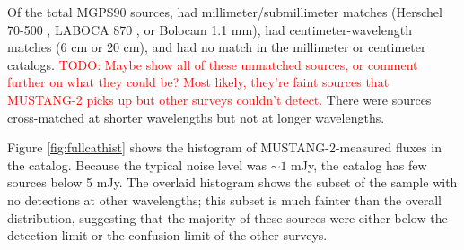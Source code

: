 \documentclass[twocolumn]{aastex62}
\def\todo#1{{\textcolor{red}{TODO: #1}}}
\newcommand{\MGPS}{MGPS90\xspace}
\newcommand{\MUSTANG}{MUSTANG-2\xspace}
\begin{document}

Of the \nsources total \MGPS sources, \mmdetections had millimeter/submillimeter
matches (Herschel 70-500 \um, LABOCA 870 \um, or Bolocam 1.1 mm), \cmdetections 
had centimeter-wavelength matches (6 cm or 20 cm), and \cmmmnondetections
had no match in the millimeter or centimeter catalogs.  \todo{Maybe show all of these unmatched sources, or comment further on what they could be?  Most likely, they're faint sources that \MUSTANG picks up but other surveys couldn't detect.}  There were
\mmdetectionscmnondetections sources cross-matched at shorter wavelengths
but not at longer wavelengths.  


Figure \ref{fig:fullcathist} shows the histogram of \MUSTANG-measured fluxes
in the catalog.  Because the typical noise level was $\sim1$ mJy, the catalog
has few sources below 5 mJy.  The overlaid histogram shows the subset of
the sample with no detections at other wavelengths; this subset is much
fainter than the overall distribution, suggesting that the majority
of these sources were either below the detection limit or the confusion
limit of the other surveys.  
\end{document}

